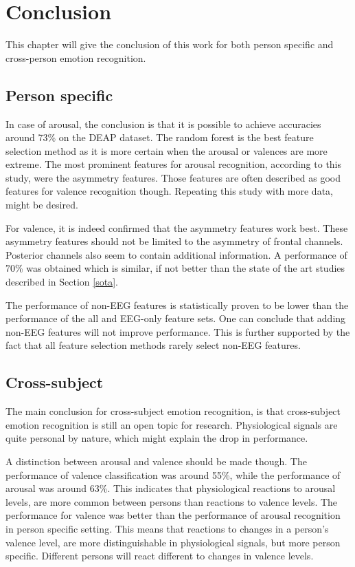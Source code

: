 \chapter{Conclusion}
{\samenvatting This chapter will give the conclusion of this work for both person specific and cross-person emotion recognition.}

\section{Person specific}
In case of arousal, the conclusion is that it is possible to achieve accuracies around 73\% on the DEAP dataset. The random forest is the best feature selection method as it is more certain when the arousal or valences are more extreme. The most prominent features for arousal recognition, according to this study, were the asymmetry features. Those features are often described as good features for valence recognition though. Repeating this study with more data, might be desired.

\npar

For valence, it is indeed confirmed that the asymmetry features work best. These asymmetry features should not be limited to the asymmetry of frontal channels. Posterior channels also seem to contain additional information. A performance of 70\% was obtained which is similar, if not better than the state of the art studies described in Section \ref{sota}. 

\npar

The performance of non-EEG features is statistically proven to be lower than the performance of the all and EEG-only feature sets. One can conclude that adding non-EEG features will not improve performance. This is further supported by the fact that all feature selection methods rarely select non-EEG features. 

\clearpage

\section{Cross-subject}

The main conclusion for cross-subject emotion recognition, is that cross-subject emotion recognition is still an open topic for research. Physiological signals are quite personal by nature, which might explain the drop in performance.

\npar 

A distinction between arousal and valence should be made though. The performance of valence classification was around 55\%, while the performance of arousal was around 63\%. This indicates that physiological reactions to arousal levels, are more common between persons than reactions to valence levels. The performance for valence was better than the performance of arousal recognition in person specific setting. This means that reactions to changes in a person's valence level, are more distinguishable in physiological signals, but more person specific. Different persons will react different to changes in valence levels.

